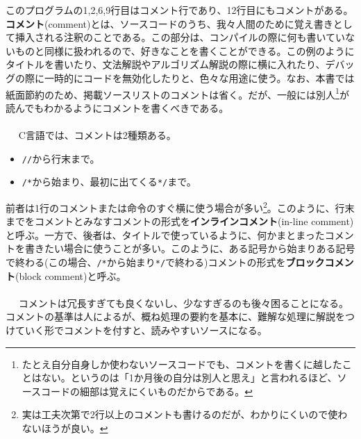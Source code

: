 このプログラムの1,2,6,9行目はコメント行であり、12行目にもコメントがある。\textbf{コメント}(comment)とは、ソースコードのうち、我々人間のために覚え書きとして挿入される注釈のことである。この部分は、コンパイルの際に何も書いていないものと同様に扱われるので、好きなことを書くことができる。この例のようにタイトルを書いたり、文法解説やアルゴリズム解説の際に横に入れたり、デバッグの際に一時的にコードを無効化したりと、色々な用途に使う。なお、本書では紙面節約のため、掲載ソースリストのコメントは省く。だが、一般には別人\footnote{たとえ自分自身しか使わないソースコードでも、コメントを書くに越したことはない。というのは「1か月後の自分は別人と思え」と言われるほど、ソースコードの細部は覚えにくいものだからである。}が読んでもわかるようにコメントを書くべきである。
\\ \\　
C言語では、コメントは2種類ある。
\begin{itemize}
\item \verb|//|から行末まで。
\item \verb|/*|から始まり、最初に出てくる\verb|*/|まで。
\end{itemize}
前者は1行のコメントまたは命令のすぐ横に使う場合が多い\footnote{実は工夫次第で2行以上のコメントも書けるのだが、わかりにくいので使わないほうが良い。}。このように、行末までをコメントとみなすコメントの形式を\textbf{インラインコメント}(in-line comment)と呼ぶ。一方で、後者は、タイトルで使っているように、何かまとまったコメントを書きたい場合に使うことが多い。このように、ある記号から始まりある記号で終わる(この場合、\verb|/*|から始まり\verb|*/|で終わる)コメントの形式を\textbf{ブロックコメント}(block comment)と呼ぶ。
\\ \\　
コメントは冗長すぎても良くないし、少なすぎるのも後々困ることになる。コメントの基準は人によるが、概ね処理の要約を基本に、難解な処理に解説をつけていく形でコメントを付すと、読みやすいソースになる。

